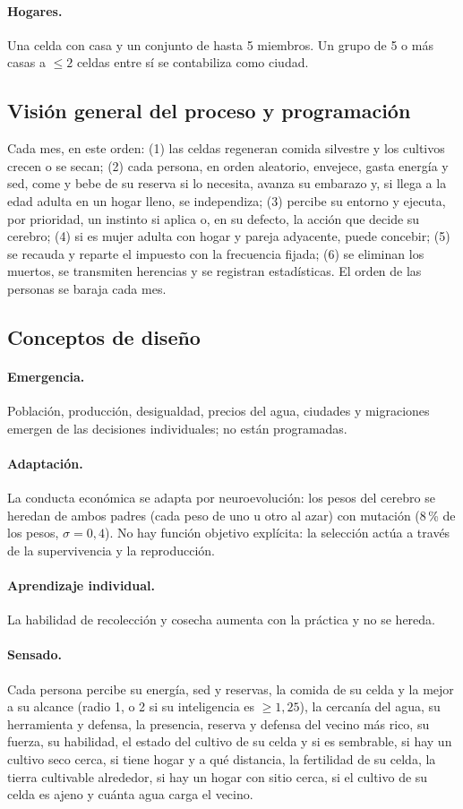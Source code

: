\documentclass[11pt,a4paper]{article}
\begin{document}
\paragraph{Hogares.} Una celda con casa y un conjunto de hasta 5 miembros. Un grupo de 5 o más casas a $\le 2$ celdas entre sí se contabiliza como ciudad.

\subsection{Visión general del proceso y programación}
Cada mes, en este orden: (1) las celdas regeneran comida silvestre y los cultivos crecen o se secan; (2) cada persona, en orden aleatorio, envejece, gasta energía y sed, come y bebe de su reserva si lo necesita, avanza su embarazo y, si llega a la edad adulta en un hogar lleno, se independiza; (3) percibe su entorno y ejecuta, por prioridad, un instinto si aplica o, en su defecto, la acción que decide su cerebro; (4) si es mujer adulta con hogar y pareja adyacente, puede concebir; (5) se recauda y reparte el impuesto con la frecuencia fijada; (6) se eliminan los muertos, se transmiten herencias y se registran estadísticas. El orden de las personas se baraja cada mes.

\subsection{Conceptos de diseño}
\paragraph{Emergencia.} Población, producción, desigualdad, precios del agua, ciudades y migraciones emergen de las decisiones individuales; no están programadas.
\paragraph{Adaptación.} La conducta económica se adapta por neuroevolución: los pesos del cerebro se heredan de ambos padres (cada peso de uno u otro al azar) con mutación (8\,\% de los pesos, $\sigma=0{,}4$). No hay función objetivo explícita: la selección actúa a través de la supervivencia y la reproducción.
\paragraph{Aprendizaje individual.} La habilidad de recolección y cosecha aumenta con la práctica y no se hereda.
\paragraph{Sensado.} Cada persona percibe su energía, sed y reservas, la comida de su celda y la mejor a su alcance (radio 1, o 2 si su inteligencia es $\ge 1{,}25$), la cercanía del agua, su herramienta y defensa, la presencia, reserva y defensa del vecino más rico, su fuerza, su habilidad, el estado del cultivo de su celda y si es sembrable, si hay un cultivo seco cerca, si tiene hogar y a qué distancia, la fertilidad de su celda, la tierra cultivable alrededor, si hay un hogar con sitio cerca, si el cultivo de su celda es ajeno y cuánta agua carga el vecino.
\end{document}
